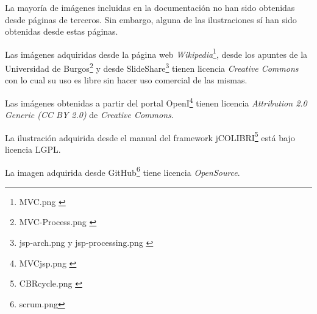 La mayoría de imágenes incluidas en la documentación no han sido obtenidas desde páginas de terceros. Sin embargo, alguna de las ilustraciones sí han sido obtenidas desde estas páginas.

Las imágenes adquiridas desde la página web \emph{Wikipedia}\footnote{MVC.png \cite{img:mvc}}, desde los apuntes de la Universidad de Burgos\footnote{MVC-Process.png \cite{img:mvc2}} y desde SlideShare\footnote{jsp-arch.png \cite{img:jsp2} y jsp-processing.png \cite{img:jsp1}} tienen licencia \emph{Creative Commons} con lo cual su uso es libre sin hacer uso comercial de las mismas.

Las imágenes obtenidas a partir del portal OpenI\footnote{MVCjsp.png \cite{img:repo}} tienen licencia \emph{Attribution 2.0 Generic (CC BY 2.0)} de \emph{Creative Commons}.

La ilustración adquirida desde el manual del framework jCOLIBRI\footnote{CBRcycle.png \cite{img:cbr}} está bajo licencia LGPL.

La imagen adquirida desde GitHub\footnote{scrum.png\cite{img:scrum}} tiene licencia \emph{OpenSource}.

